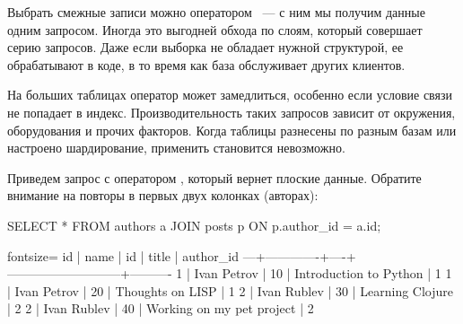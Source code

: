 
Выбрать смежные записи можно оператором ~--- с ним мы получим данные одним запросом. Иногда это выгодней обхода по слоям, который совершает серию запросов. Даже если выборка не обладает нужной структурой, ее обрабатывают в коде, в то время как база обслуживает других клиентов.

На больших таблицах оператор  может замедлиться, особенно если условие связи не попадает в индекс. Производительность таких запросов зависит от окружения, оборудования и прочих факторов. Когда таблицы разнесены по разным базам или настроено шардирование, применить  становится невозможно.

Приведем запрос с оператором , который вернет плоские данные. Обратите внимание на повторы в первых двух колонках (авторах):

\begin{english}
  \begin{sql}
SELECT *
FROM authors a
JOIN posts p ON p.author_id = a.id;
  \end{sql}
\end{english}

\begin{english}
  \begin{text*}{fontsize=\small}
id |    name     | id |            title          | author_id
---+-------------+----+---------------------------+----------
 1 | Ivan Petrov | 10 | Introduction to Python    |         1
 1 | Ivan Petrov | 20 | Thoughts on LISP          |         1
 2 | Ivan Rublev | 30 | Learning Clojure          |         2
 2 | Ivan Rublev | 40 | Working on my pet project |         2
  \end{text*}
\end{english}


